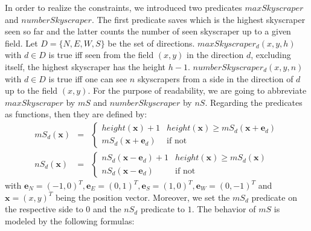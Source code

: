\documentclass[a4paper, 12pt, titlepage]{article}
\begin{document}
In order to realize the constraints, we introduced two predicates $maxSkyscraper$ and $numberSkyscraper$. The first predicate saves which is the highest skyscraper seen so far and the latter counts the number of seen skyscraper up to a given field. Let $D=\{N, E, W, S\}$ be the set of directions. $maxSkyscraper_{d}(x,y,h)$ with $d \in D$ is true iff seen from the field $(x,y)$ in the direction $d$, excluding itself, the highest skyscraper has the height $h-1$. $numberSkyscraper_{d}(x,y,n)$ with $d \in D$ is true iff one can see $n$ skyscrapers from a side in the direction of $d$ up to the field $(x,y)$. For the purpose of readability, we are going to abbreviate $maxSkyscraper$ by $mS$ and $numberSkyscraper$ by $nS$. Regarding the predicates as functions, then they are defined by:
	\begin{eqnarray}
		mS_{d}(\pmb x) &=& 
		\begin{cases}
			height(\pmb x)+1 & height(\pmb x) \ge mS_{d}(\pmb x + \pmb e_{d})\\
			mS_{d}(\pmb x + \pmb e_{d}) &\text{if not}
		\end{cases}
		\\
		nS_{d}(\pmb x) &=&
		\begin{cases}
			nS_{d}(\pmb x - \pmb e_{d}) + 1 & height(\pmb x) \ge mS_{d}(\pmb x)\\
			nS_{d}(\pmb x - \pmb e_{d}) &\text{if not}
		\end{cases}
	\end{eqnarray}
with $\pmb e_{N} = (-1,0)^T, \pmb e_{E} = (0,1)^T, \pmb e_{S} = (1,0)^T,\pmb e_{W} = (0,-1)^T$ and $\pmb x = (x,y)^T$ being the position vector. Moreover, we set the $mS_{d}$ predicate on the respective side to $0$ and the $nS_{d}$ predicate to $1$. The behavior of $mS$ is modeled by the following formulas:
\end{document}

